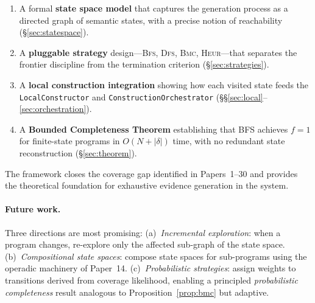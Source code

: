 \documentclass[11pt]{article}
\newcommand{\Trans}{\delta}                   %
\newcommand{\BFS}{\textsc{Bfs}}
\newcommand{\DFS}{\textsc{Dfs}}
\newcommand{\BMC}{\textsc{Bmc}}
\newcommand{\HEUR}{\textsc{Heur}}
\newcommand{\covfrac}{f}                      %
\begin{document}
\begin{enumerate}
  \item A formal \textbf{state space model} that captures the
    generation process as a directed graph of semantic states, with a
    precise notion of reachability (\S\ref{sec:statespace}).

  \item A \textbf{pluggable strategy} design---\BFS{}, \DFS{}, \BMC{},
    \HEUR{}---that separates the frontier discipline from the
    termination criterion (\S\ref{sec:strategies}).

  \item A \textbf{local construction integration} showing how each
    visited state feeds the \texttt{LocalConstructor} and
    \texttt{ConstructionOrchestrator} (\S\S\ref{sec:local}--\ref{sec:orchestration}).

  \item A \textbf{Bounded Completeness Theorem} establishing that BFS
    achieves $\covfrac = 1$ for finite-state programs in $O(N +
    |\Trans|)$ time, with no redundant state reconstruction
    (\S\ref{sec:theorem}).
\end{enumerate}

The framework closes the coverage gap identified in Papers~1--30 and
provides the theoretical foundation for exhaustive evidence generation
in the \JuGeo{} system.

\paragraph{Future work.}
Three directions are most promising:
(a)~\emph{Incremental exploration}: when a program changes, re-explore
only the affected sub-graph of the state space.
(b)~\emph{Compositional state spaces}: compose state spaces for
sub-programs using the operadic machinery of Paper~14.
(c)~\emph{Probabilistic strategies}: assign weights to transitions
derived from coverage likelihood, enabling a principled
\emph{probabilistic completeness} result analogous to
Proposition~\ref{prop:bmc} but adaptive.
\end{document}
